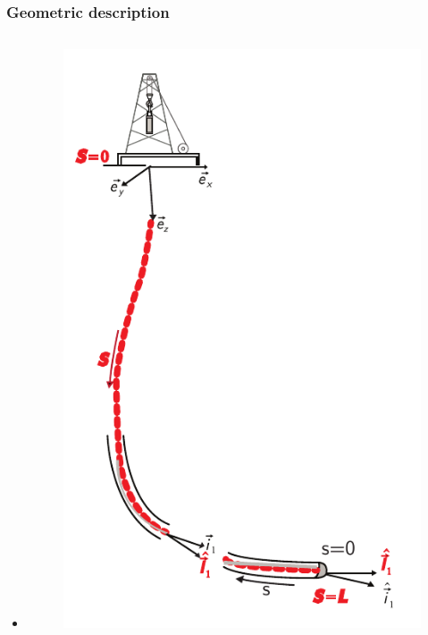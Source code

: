 \documentclass{beamer}
\begin{document}
\begin{frame}\frametitle{Geometric description}
	\begin{columns}[T]
		\hspace{1cm}\begin{column}{0.5\textwidth}
			\vspace{-20pt}
			\begin{itemize} 
			\item <1|only@1> [] \vspace{3pt}\begin{figure}[ht]\centering
									\includegraphics[width=1\textwidth]{images/geodesca.pdf}
								\end{figure}

\end{itemize}
\end{column}
\end{columns}
\end{frame}
\end{document}
